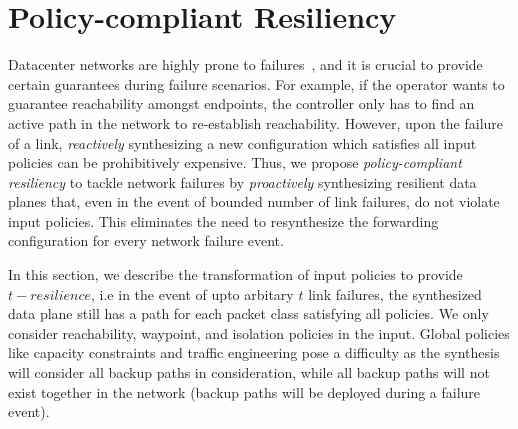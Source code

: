 \section{Policy-compliant Resiliency}
Datacenter networks are highly prone to failures~\cite{datacenterfailures}, 
and it is crucial to provide certain guarantees during failure
scenarios. For example, if the operator wants to guarantee
reachability amongst endpoints, the controller only has to find an active
path in the network to re-establish reachability. 
However, upon the failure of a link, {\em reactively} synthesizing a new configuration which satisfies
all input policies can be prohibitively expensive.
Thus, we propose 
\emph{policy-compliant resiliency} to tackle network failures
by \emph{proactively} synthesizing resilient data planes that, even in the event
of bounded number of link failures, do not violate input policies. This eliminates the 
need to resynthesize the forwarding
configuration for every network failure event.

In this section, we describe the transformation of input 
policies to provide $t-resilience$, i.e in the event of upto arbitary
$t$ link failures, the synthesized data plane still has a path
for each packet class  satisfying all policies. We only consider reachability, waypoint,
and isolation policies in the input. Global policies like capacity constraints
and traffic engineering pose a difficulty as the synthesis will consider
all backup paths in consideration, while all backup paths will not 
exist together in the network (backup paths will be deployed during
a failure event). 

